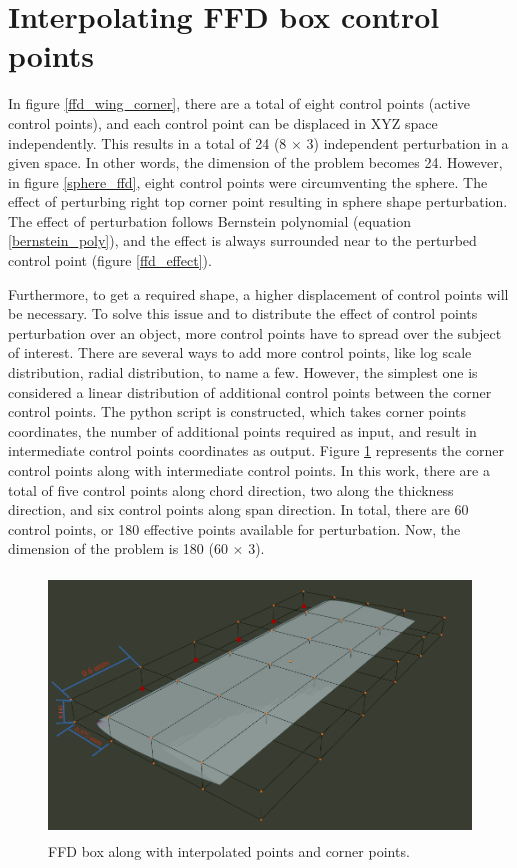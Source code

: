 \section{Interpolating FFD box control points}
In figure \ref{ffd_wing_corner}, there are a total of eight control points (active control points), and each control point can be displaced in XYZ space independently. This results in a total of 24 (8 $\times$ 3) independent perturbation in a given space. In other words, the dimension of the problem becomes 24. However, in figure \ref{sphere_ffd}, eight control points were circumventing the sphere. The effect of perturbing right top corner point resulting in sphere shape perturbation. The effect of perturbation follows Bernstein polynomial (equation \ref{bernstein_poly}), and the effect is always surrounded near to the perturbed control point (figure \ref{ffd_effect}).

Furthermore, to get a required shape, a higher displacement of control points will be necessary. To solve this issue and to distribute the effect of control points perturbation over an object, more control points have to spread over the subject of interest. There are several ways to add more control points, like log scale distribution, radial distribution, to name a few. However, the simplest one is considered a linear distribution of additional control points between the corner control points. The python script is constructed, which takes corner points coordinates, the number of additional points required as input, and result in intermediate control points coordinates as output. Figure \ref{ffd_wing_interpolate} represents the corner control points along with intermediate control points. In this work, there are a total of five control points along chord direction, two along the thickness direction, and six control points along span direction. In total, there are 60 control points, or 180 effective points available for perturbation. Now, the dimension of the problem is 180 (60 $\times$ 3).    
\begin{figure}
    \centering
    \includegraphics[height = 70mm, width=\textwidth]{figures/wing_all_cp_FFD.png}
    \caption{FFD box along with interpolated points and corner points.}
    \label{ffd_wing_interpolate}
\end{figure}

